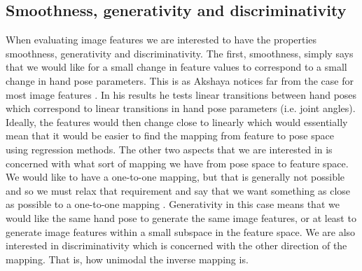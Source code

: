 \documentclass[a4paper,11pt]{kth-mag}
\begin{document}
\subsection{Smoothness, generativity and discriminativity}
\label{sec:featureproperties}
When evaluating image features we are interested to have the properties smoothness, generativity and discriminativity.
The first, smoothness, simply says that we would like for a small change in feature values to correspond to a small change in hand pose parameters.
This is as Akshaya notices far from the case for most image features \cite{akshayaMaster}.
In his results he tests linear transitions between hand poses which correspond to linear transitions in hand pose parameters (i.e. joint angles).
Ideally, the features would then change close to linearly which would essentially mean that it would be easier to find the mapping from feature to pose space using regression methods.
The other two aspects that we are interested in is concerned with what sort of mapping we have from pose space to feature space.
We would like to have a one-to-one mapping, but that is generally not possible and so we must relax that requirement and say that we want something as close as possible to a one-to-one mapping \cite{akshayaMaster}.
Generativity in this case means that we would like the same hand pose to generate the same image features, or at least to generate image features within a small subspace in the feature space.
We are also interested in discriminativity which is concerned with the other direction of the mapping.
That is, how unimodal the inverse mapping is.

\end{document}
